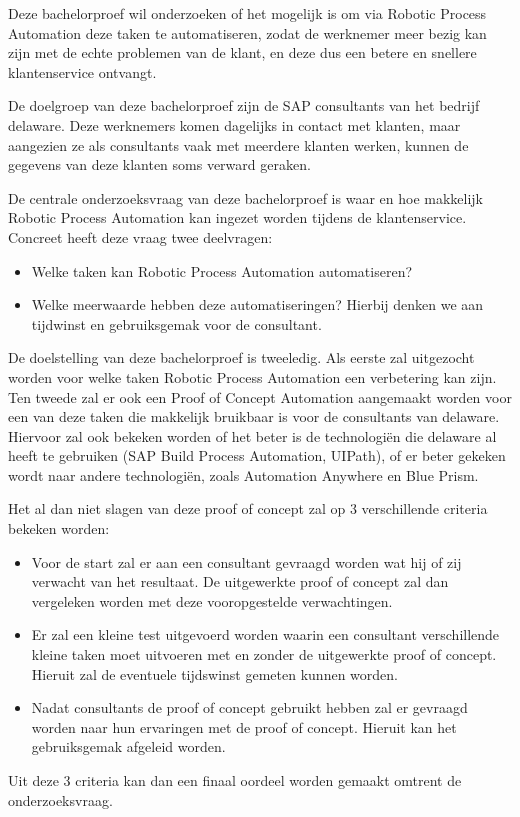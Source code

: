Deze bachelorproef wil onderzoeken of het mogelijk is om via Robotic Process Automation deze taken te automatiseren, zodat de werknemer meer bezig kan zijn met de echte problemen van de klant, en deze dus een betere en snellere klantenservice ontvangt.

De doelgroep van deze bachelorproef zijn de SAP consultants van het bedrijf delaware. Deze werknemers komen dagelijks in contact met klanten, maar aangezien ze als consultants vaak met meerdere klanten werken, kunnen de gegevens van deze klanten soms verward geraken.

De centrale onderzoeksvraag van deze bachelorproef is waar en hoe makkelijk Robotic Process Automation kan ingezet worden tijdens de klantenservice. Concreet heeft deze vraag twee deelvragen: 

\begin{itemize}
  \item Welke taken kan Robotic Process Automation automatiseren?
  \item Welke meerwaarde hebben deze automatiseringen? Hierbij denken we aan tijdwinst en gebruiksgemak voor de consultant.
\end{itemize}

De doelstelling van deze bachelorproef is tweeledig. Als eerste zal uitgezocht worden voor welke taken Robotic Process Automation een verbetering kan zijn. Ten tweede zal er ook een Proof of Concept Automation aangemaakt worden voor een van deze taken die makkelijk bruikbaar is voor de consultants van delaware. Hiervoor zal ook bekeken worden of het beter is de technologiën die delaware al heeft te gebruiken (SAP Build Process Automation, UIPath), of er beter gekeken wordt naar andere technologiën, zoals Automation Anywhere en Blue Prism. 

Het al dan niet slagen van deze proof of concept zal op 3 verschillende criteria bekeken worden:
\begin{itemize}
  \item Voor de start zal er aan een consultant gevraagd worden wat hij of zij verwacht van het resultaat. De uitgewerkte proof of concept zal dan vergeleken worden met deze vooropgestelde verwachtingen.
  \item Er zal een kleine test uitgevoerd worden waarin een consultant verschillende kleine taken moet uitvoeren met en zonder de uitgewerkte proof of concept. Hieruit zal de eventuele tijdswinst gemeten kunnen worden.
  \item Nadat consultants de proof of concept gebruikt hebben zal er gevraagd worden naar hun ervaringen met de proof of concept. Hieruit kan het gebruiksgemak afgeleid worden.
\end{itemize}
Uit deze 3 criteria kan dan een finaal oordeel worden gemaakt omtrent de onderzoeksvraag.

